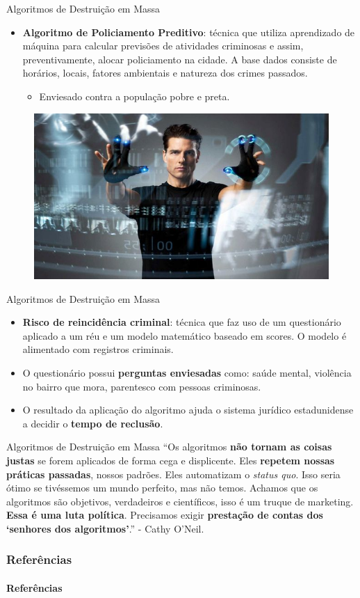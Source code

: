 \documentclass{beamer}
\begin{document}
\begin{frame}{Algoritmos de Destruição em Massa}
    \begin{itemize}
        \item \textbf{Algoritmo de Policiamento Preditivo}: técnica que utiliza aprendizado de máquina para calcular previsões de atividades criminosas e assim, preventivamente, alocar policiamento na cidade. A base dados consiste de horários, locais, fatores ambientais e natureza dos crimes passados.
        \begin{itemize}
            \item Enviesado contra a população pobre e preta.
        \end{itemize}
    \end{itemize}  
    \begin{figure}
        \centering
        \includegraphics[width=0.4\linewidth]{img/minority.jpeg}
    \end{figure}
\end{frame}

\begin{frame}{Algoritmos de Destruição em Massa}
    \begin{itemize}
        \item \textbf{Risco de reincidência criminal}: técnica que faz uso de um questionário aplicado a um réu e um modelo matemático baseado em scores. O modelo é alimentado com registros criminais.
        \item O questionário possui \textbf{perguntas enviesadas} como: saúde mental, violência no bairro que mora, parentesco com pessoas criminosas.
        \item O resultado da aplicação do algoritmo ajuda o sistema jurídico estadunidense a decidir o \textbf{tempo de reclusão}.
    \end{itemize}  
\end{frame}

\begin{frame}{Algoritmos de Destruição em Massa}
    ``Os algoritmos \textbf{não tornam as coisas justas} se forem aplicados de forma cega e displicente. Eles \textbf{repetem nossas práticas passadas}, nossos padrões. Eles automatizam o \textit{status quo}. Isso seria ótimo se tivéssemos um mundo perfeito, mas não temos. Achamos que os algoritmos são objetivos, verdadeiros e científicos, isso é um truque de marketing. \textbf{Essa é uma luta política}. Precisamos exigir \textbf{prestação de contas dos `senhores dos algoritmos'}.'' - Cathy O'Neil.
\end{frame}

\begin{frame}[allowframebreaks]
    \frametitle{Referências}
    \framesubtitle{Referências}
    
    
\end{frame}
\end{document}
